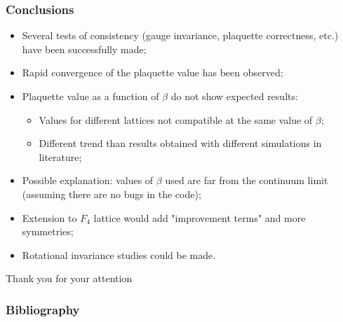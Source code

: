 \documentclass{beamer}
\begin{document}
\begin{frame}
  \frametitle{Conclusions}
  \centering
  \begin{itemize}
    \item<1->[\ding{228}] Several tests of consistency (gauge invariance, plaquette correctness, etc.) have been successfully made;
    \item<2->[\ding{228}] Rapid convergence of the plaquette value has been observed;
    \item<3->[\ding{228}] Plaquette value as a function of $\beta$ do not show expected results:
    \begin{itemize}
      \item<3-> Values for different lattices not compatible at the same value of $\beta$;
      \item<4-> Different trend than results obtained with different simulations in literature\cite{Celmaster:1983vy};
    \end{itemize}
    \item<5->[\ding{228}] Possible explanation: values of $\beta$ used are far from the continuum limit (assuming there are no bugs in the code);
    \item<6->[\ding{228}] Extension to $F_4$ lattice would add "improvement terms" and more symmetries;
    \item<7->[\ding{228}] Rotational invariance studies could be made.
  \end{itemize}
\end{frame}

\begin{comment}
\begin{frame}
  \frametitle{Work in Progress}
  \begin{columns}
  \column{0.5\textwidth}
\onslide<1->
    \begin{itemize}
    \item Implement the $F_4$ lattice in the simulation program and make efficiency studies;
    \vspace{5\baselineskip}
\onslide<2->
    \item Make a rotational invariance study on the new lattice, hoping to get better results than the Simple Hypercubic lattice.
    \end{itemize}
    
\onslide<1->
  \column{0.1\textwidth}
  \column{0.3\textwidth}
    \texttt{[image: F4\_root\_lattice.png]}\\
    \vspace{\baselineskip}
\onslide<2->
    \texttt{[image: plots/XY\_Plane\_nt6\_ns16\_beta2.35\_copied.png]}
  \end{columns}
\end{frame}
\end{comment}

\begin{frame}
  \centering
  \Huge
  Thank you for your attention
\end{frame}

\begin{frame}[allowframebreaks]
  \frametitle{Bibliography}
  \printbibliography
\end{frame}
\end{document}
